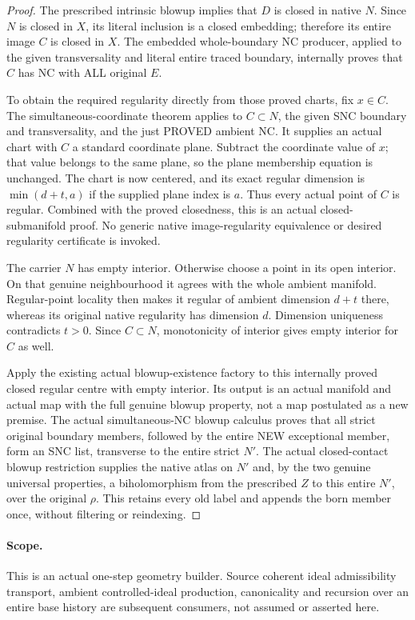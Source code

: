 \begin{proof}
The prescribed intrinsic blowup implies that $D$ is closed in native $N$.
Since $N$ is closed in $X$, its literal inclusion is a closed embedding;
therefore its entire image $C$ is closed in $X$. The embedded whole-boundary
NC producer, applied to the given transversality and literal entire traced
boundary, internally proves that $C$ has NC with ALL original $E$.

To obtain the required regularity directly from those proved charts, fix
$x\in C$. The simultaneous-coordinate theorem applies to $C\subset N$,
the given SNC boundary and transversality, and the just PROVED ambient NC.
It supplies an actual chart with $C$ a standard coordinate plane. Subtract
the coordinate value of $x$; that value belongs to the same plane, so the
plane membership equation is unchanged. The chart is now centered, and
its exact regular dimension is $\min(d+t,a)$ if the supplied plane index is
$a$. Thus every actual point of $C$ is regular. Combined with the proved
closedness, this is an actual closed-submanifold proof. No generic native
image-regularity equivalence or desired regularity certificate is invoked.

The carrier $N$ has empty interior. Otherwise choose a point in its open
interior. On that genuine neighbourhood it agrees with the whole ambient
manifold. Regular-point locality then makes it regular of ambient dimension
$d+t$ there, whereas its original native regularity has dimension $d$.
Dimension uniqueness contradicts $t>0$. Since $C\subset N$, monotonicity of
interior gives empty interior for $C$ as well.

Apply the existing actual blowup-existence factory to this internally proved
closed regular centre with empty interior. Its output is an actual manifold
and actual map with the full genuine blowup property, not a map postulated
as a new premise. The actual simultaneous-NC blowup calculus proves that
all strict original boundary members, followed by the entire NEW exceptional
member, form an SNC list, transverse to the entire strict $N'$. The actual
closed-contact blowup restriction supplies the native atlas on $N'$ and,
by the two genuine universal properties, a biholomorphism from the prescribed
$Z$ to this entire $N'$, over the original $\rho$. This retains every old
label and appends the born member once, without filtering or reindexing.
\end{proof}

\paragraph{Scope.} This is an actual one-step geometry builder. Source
coherent ideal admissibility transport, ambient controlled-ideal production,
canonicality and recursion over an entire base history are subsequent
consumers, not assumed or asserted here.
